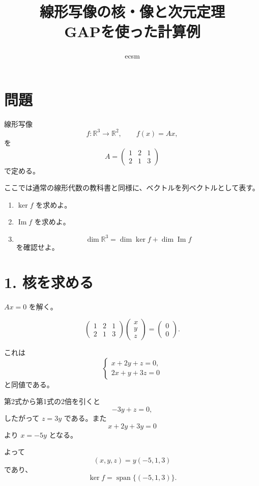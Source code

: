 \documentclass[a4paper,11pt]{ltjsarticle}
\title{線形写像の核・像と次元定理\\
\large GAPを使った計算例}
\author{ecsm}
\date{}
\begin{document}
\maketitle

\section*{問題}

線形写像
\[
 f:\mathbb{R}^3\longrightarrow\mathbb{R}^2,\qquad
 f(x)=Ax,
\]
を
\[
 A=
 \begin{pmatrix}
  1&2&1\\
  2&1&3
 \end{pmatrix}
\]
で定める。

ここでは通常の線形代数の教科書と同様に、ベクトルを列ベクトルとして表す。

\begin{enumerate}
  \item $\ker f$ を求めよ。
  \item $\operatorname{Im}f$ を求めよ。
  \item
  \[
    \dim\mathbb{R}^3
    =
    \dim\ker f+\dim\operatorname{Im}f
  \]
  を確認せよ。
\end{enumerate}

\section*{1. 核を求める}

$Ax=0$ を解く。

\[
\begin{pmatrix}
1&2&1\\
2&1&3
\end{pmatrix}
\begin{pmatrix}
x\\y\\z
\end{pmatrix}
=
\begin{pmatrix}
0\\0
\end{pmatrix}.
\]

これは
\[
\begin{cases}
x+2y+z=0,\\
2x+y+3z=0
\end{cases}
\]
と同値である。

第2式から第1式の2倍を引くと
\[
-3y+z=0,
\]
したがって $z=3y$ である。また
\[
x+2y+3y=0
\]
より $x=-5y$ となる。

よって
\[
(x,y,z)=y(-5,1,3)
\]
であり、
\[
\boxed{\ker f=\operatorname{span}\{(-5,1,3)\}}.
\]
\end{document}
